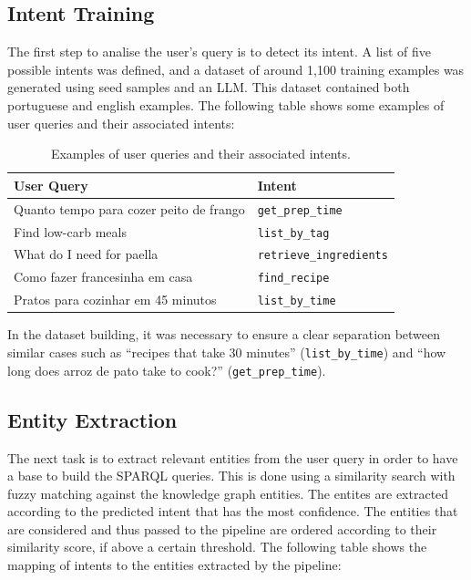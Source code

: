 \documentclass{article}
\begin{document}
\subsection{Intent Training}

\noindent
The first step to analise the user's query is to detect its intent. A list of five possible intents was defined, and a dataset of around 1,100 training examples was generated using seed samples and an LLM. This dataset contained both portuguese and english examples. The following table shows some examples of user queries and their associated intents:


\begin{table}[h!]
\centering
\scriptsize
\caption{Examples of user queries and their associated intents.}
\label{tab:intent-examples}
\begin{tabularx}{\columnwidth}{@{} l @{\hspace{1.5em}} Y @{}}
\toprule
\textbf{User Query} & \textbf{Intent} \\
\midrule
Quanto tempo para cozer peito de frango & \texttt{get\_prep\_time} \\
Find low-carb meals & \texttt{list\_by\_tag} \\
What do I need for paella & \texttt{retrieve\_ingredients} \\
Como fazer francesinha em casa & \texttt{find\_recipe} \\
Pratos para cozinhar em 45 minutos & \texttt{list\_by\_time} \\
\bottomrule
\end{tabularx}
\end{table}


In the dataset building, it was necessary to ensure a clear separation between similar cases such as ``recipes that take 30 minutes'' (\texttt{list\_by\_time}) and ``how long does arroz de pato take to cook?'' (\texttt{get\_prep\_time}).


\subsection{Entity Extraction}
\noindent
The next task is to extract relevant entities from the user query in order to have a base to build the SPARQL queries. This is done using a similarity search with fuzzy matching against the knowledge graph entities. The entites are extracted according to the predicted intent that has the most confidence. The entities that are considered and thus passed to the pipeline are ordered according to their similarity score, if above a certain threshold. The following table shows the mapping of intents to the entities extracted by the pipeline:
\end{document}
